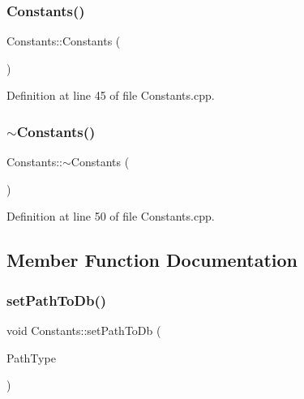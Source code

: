 \subsubsection{\texorpdfstring{Constants()}{Constants()}}
{\footnotesize\ttfamily Constants\+::\+Constants (\begin{DoxyParamCaption}{ }\end{DoxyParamCaption})}



Definition at line 45 of file Constants.\+cpp.

\hypertarget{classConstants_a2dce6c6db3f1ba4114550606fae1765a}{}\label{classConstants_a2dce6c6db3f1ba4114550606fae1765a} 
\subsubsection{\texorpdfstring{$\sim$\+Constants()}{~Constants()}}
{\footnotesize\ttfamily Constants\+::$\sim$\+Constants (\begin{DoxyParamCaption}{ }\end{DoxyParamCaption})}



Definition at line 50 of file Constants.\+cpp.



\subsection{Member Function Documentation}
\hypertarget{classConstants_a3d474cb2c4e964cb64ab6f2db6e1bf92}{}\label{classConstants_a3d474cb2c4e964cb64ab6f2db6e1bf92} 
\subsubsection{\texorpdfstring{set\+Path\+To\+Db()}{setPathToDb()}\hspace{0.1cm}{\footnotesize\ttfamily [1/2]}}
{\footnotesize\ttfamily void Constants\+::set\+Path\+To\+Db (\begin{DoxyParamCaption}\item[{\hyperlink{Constants_8h_a9558e0854b1cdaf803f7a80df80ab91b}{Matty\+Path\+To\+Db\+Type}}]{Path\+Type }\end{DoxyParamCaption})\hspace{0.3cm}{\ttfamily [static]}}



